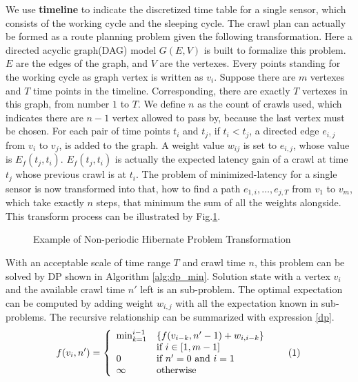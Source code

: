 \documentclass[conference]{IEEEtran}
\newcommand\numberthis{\addtocounter{equation}{1}\tag{\theequation}}
\begin{document}
We use \textbf{timeline} to indicate the discretized time table for a single sensor, which consists of the working cycle and the sleeping cycle.
The crawl plan can actually be formed as a route planning problem given the following transformation.
Here a directed acyclic graph(DAG) model $G(E,V)$ is built to formalize this problem.
$E$ are the edges of the graph, and $V$ are the vertexes. 
Every points standing for the working cycle as graph vertex is written as $v_i$. 
Suppose there are $m$ vertexes and $T$ time points in the timeline. 
Corresponding, there are exactly $T$ vertexes in this graph, from number $1$ to $T$. 
We define $n$ as the count of crawls used, which indicates there are $n-1$ vertex allowed to pass by, because the last vertex must be chosen. 
For each pair of time points $t_i$ and $t_j$, if $t_i<t_j$, a directed edge $e_{i,j}$ from $v_i$ to $v_j$, is added to the graph. 
A weight value $w_{ij}$ is set to $e_{i,j}$, whose value is $E_f(t_j, t_i)$.
$E_f(t_j, t_i)$ is actually the expected latency gain of a crawl at time $t_j$ whose previous crawl is at $t_i$.
The problem of minimized-latency for a single sensor is now transformed into that, how to find a path $e_{1,i},\ldots,e_{j,T}$ from $v_1$ to $v_m$, which take exactly $n$ steps, that minimum the sum of all the weights alongside. 
This transform process can be illustrated by Fig.\ref{fig:problemtrans}.
\begin{figure}
	\centering
	
	\captionsetup{justification=centering}
	\caption{Example of Non-periodic Hibernate Problem Transformation}
	\vspace{-1.5em}
	\label{fig:problemtrans}
\end{figure}

With an acceptable scale of time range $T$ and crawl time $n$, this problem can be solved by DP shown in Algorithm \ref{alg:dp_min}. 
Solution state with a vertex $v_i$ and the available crawl time $n'$ left is an sub-problem. 
The optimal expectation can be computed by adding weight $w_{i,j}$ with all the expectation known in sub-problems. 
The recursive relationship can be summarized with expression \eqref{dp}.
\[
f(v_i, n')=\left\{
\begin{array}{ll}
\min_{k=1}^{i-1} & \{f(v_{i-k}, n'-1)+w_{i,i-k}\}\\
& \text{if } i\in[1, m-1]\\
0 & \text{if } n'=0 \text{ and } i=1\\
\infty & \text{otherwise}
\end{array}\numberthis \label{dp}
\right.
\]
\end{document}
